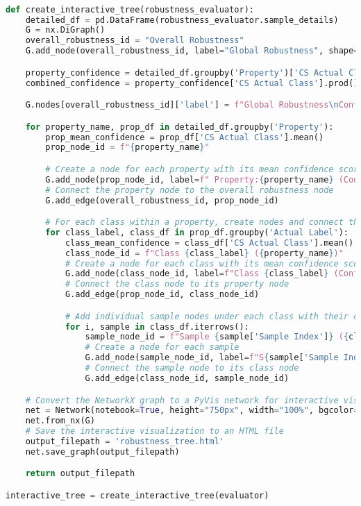 \documentclass{article}
\begin{document}
\begin{lstlisting}[language=Python, caption=Python Code for Creating an Interactive Visualization Tree for Model Robustness]

def create_interactive_tree(robustness_evaluator):
    detailed_df = pd.DataFrame(robustness_evaluator.sample_details)
    G = nx.DiGraph()
    overall_robustness_id = "Overall Robustness"
    G.add_node(overall_robustness_id, label="Global Robustness", shape='circle', color="skyblue")

    property_confidence = detailed_df.groupby('Property')['CS Actual Class'].mean().reset_index()
    combined_confidence = property_confidence['CS Actual Class'].prod()

    G.nodes[overall_robustness_id]['label'] = f"Global Robustness\nConfidence: {combined_confidence:.3f}"

    for property_name, prop_df in detailed_df.groupby('Property'):
        prop_mean_confidence = prop_df['CS Actual Class'].mean()
        prop_node_id = f"{property_name}"

        # Create a node for each property with its mean confidence score
        G.add_node(prop_node_id, label=f" Property:{property_name} (Confidence: {prop_mean_confidence:.2f})", color="lightgreen")
        # Connect the property node to the overall robustness node
        G.add_edge(overall_robustness_id, prop_node_id)

        # For each class within a property, create nodes and connect them to their respective property node
        for class_label, class_df in prop_df.groupby('Actual Label'):
            class_mean_confidence = class_df['CS Actual Class'].mean()
            class_node_id = f"Class {class_label} ({property_name})"
            # Create a node for each class with its mean confidence score
            G.add_node(class_node_id, label=f"Class {class_label} (Confidence: {class_mean_confidence:.2f})", color="yellow")
            # Connect the class node to its property node
            G.add_edge(prop_node_id, class_node_id)

            # Add individual sample nodes under each class with their confidence scores
            for i, sample in class_df.iterrows():
                sample_node_id = f"Sample {sample['Sample Index']} ({class_label}, {property_name})"
                # Create a node for each sample
                G.add_node(sample_node_id, label=f"S{sample['Sample Index']} (Confidence: {sample['CS Actual Class']:.2f})", color="grey")
                # Connect the sample node to its class node
                G.add_edge(class_node_id, sample_node_id)

    # Convert the NetworkX graph to a PyVis network for interactive visualization
    net = Network(notebook=True, height="750px", width="100%", bgcolor="#222222", font_color="white")
    net.from_nx(G)
    # Save the interactive visualization to an HTML file
    output_filepath = 'robustness_tree.html'
    net.save_graph(output_filepath)

    return output_filepath

interactive_tree = create_interactive_tree(evaluator)

\end{lstlisting}
\end{document}

